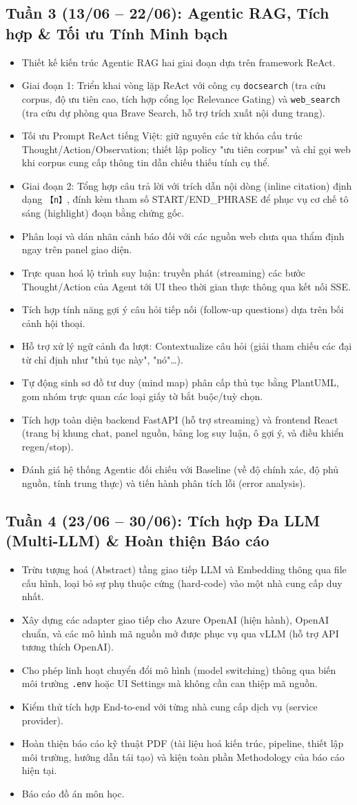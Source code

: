 \documentclass[11pt]{article}
\newcommand{\cbDone}{\item[$\boxtimes$]}
\newcommand{\cbTodo}{\item[$\square$]}
\begin{document}
\subsection{Tuần 3 (13/06 -- 22/06): Agentic RAG, Tích hợp \& Tối ưu Tính Minh bạch}
\begin{itemize}
  \cbDone Thiết kế kiến trúc Agentic RAG hai giai đoạn dựa trên framework ReAct.
  \cbDone Giai đoạn 1: Triển khai vòng lặp ReAct với công cụ \texttt{docsearch} (tra cứu corpus, độ ưu tiên cao, tích hợp cổng lọc Relevance Gating) và \texttt{web\_search} (tra cứu dự phòng qua Brave Search, hỗ trợ trích xuất nội dung trang).
  \cbDone Tối ưu Prompt ReAct tiếng Việt: giữ nguyên các từ khóa cấu trúc Thought/Action/Observation; thiết lập policy "ưu tiên corpus" và chỉ gọi web khi corpus cung cấp thông tin dẫn chiếu thiếu tính cụ thể.
  \cbDone Giai đoạn 2: Tổng hợp câu trả lời với trích dẫn nội dòng (inline citation) định dạng \texttt{【n】}, đính kèm tham số START/END\_PHRASE để phục vụ cơ chế tô sáng (highlight) đoạn bằng chứng gốc.
  \cbDone Phân loại và dán nhãn cảnh báo đối với các nguồn web chưa qua thẩm định ngay trên panel giao diện.
  \cbDone Trực quan hoá lộ trình suy luận: truyền phát (streaming) các bước Thought/Action của Agent tới UI theo thời gian thực thông qua kết nối SSE.
  \cbDone Tích hợp tính năng gợi ý câu hỏi tiếp nối (follow-up questions) dựa trên bối cảnh hội thoại.
  \cbDone Hỗ trợ xử lý ngữ cảnh đa lượt: Contextualize câu hỏi (giải tham chiếu các đại từ chỉ định như "thủ tục này", "nó"\ldots).
  \cbDone Tự động sinh sơ đồ tư duy (mind map) phân cấp thủ tục bằng PlantUML, gom nhóm trực quan các loại giấy tờ bắt buộc/tuỳ chọn.
  \cbDone Tích hợp toàn diện backend FastAPI (hỗ trợ streaming) và frontend React (trang bị khung chat, panel nguồn, bảng log suy luận, ô gợi ý, và điều khiển regen/stop).
  \cbTodo Đánh giá hệ thống Agentic đối chiếu với Baseline (về độ chính xác, độ phủ nguồn, tính trung thực) và tiến hành phân tích lỗi (error analysis).
\end{itemize}

\subsection{Tuần 4 (23/06 -- 30/06): Tích hợp Đa LLM (Multi-LLM) \& Hoàn thiện Báo cáo}
\begin{itemize}
  \cbTodo Trừu tượng hoá (Abstract) tầng giao tiếp LLM và Embedding thông qua file cấu hình, loại bỏ sự phụ thuộc cứng (hard-code) vào một nhà cung cấp duy nhất.
  \cbTodo Xây dựng các adapter giao tiếp cho Azure OpenAI (hiện hành), OpenAI chuẩn, và các mô hình mã nguồn mở được phục vụ qua vLLM (hỗ trợ API tương thích OpenAI).
  \cbTodo Cho phép linh hoạt chuyển đổi mô hình (model switching) thông qua biến môi trường \texttt{.env} hoặc UI Settings mà không cần can thiệp mã nguồn.
  \cbTodo Kiểm thử tích hợp End-to-end với từng nhà cung cấp dịch vụ (service provider).
  \cbTodo Hoàn thiện báo cáo kỹ thuật PDF (tài liệu hoá kiến trúc, pipeline, thiết lập môi trường, hướng dẫn tái tạo) và kiện toàn phần Methodology của báo cáo hiện tại.
  \cbTodo Báo cáo đồ án môn học. 
\end{itemize}

\clearpage


\end{document}
